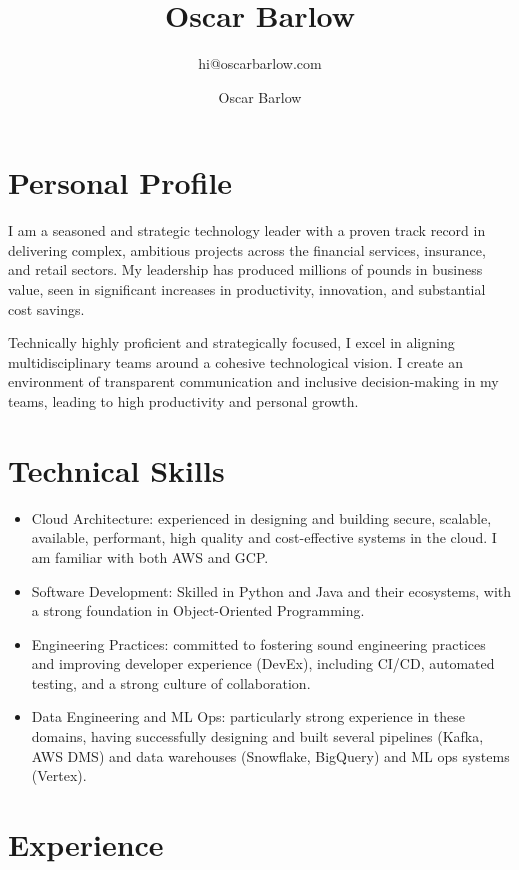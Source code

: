 \documentclass[a4paper]{scrartcl}
\author{Oscar Barlow}
\date{}
\begin{document}
\title{Oscar Barlow}
\subtitle{hi@oscarbarlow.com}
\maketitle

\section*{Personal Profile}
I am a seasoned and strategic technology leader with a proven track record in
delivering complex, ambitious projects across the financial services,
insurance,
and retail sectors. My leadership has produced
millions of pounds in business value, seen in significant increases in
productivity, innovation, and substantial cost savings.

Technically highly proficient and strategically focused, I excel in aligning
multidisciplinary
teams around a cohesive technological vision. I create an environment of
transparent communication and inclusive decision-making in my teams, leading to
high productivity and personal growth.

\section*{Technical Skills}
\begin{itemize}
      \item Cloud Architecture: experienced in designing and building secure,
            scalable, available, performant, high quality and cost-effective
            systems in the
            cloud. I am familiar with both AWS and GCP.
      \item Software Development: Skilled in Python and Java and their
            ecosystems, with a
            strong foundation in Object-Oriented Programming.
      \item Engineering Practices: committed to fostering sound engineering
            practices and improving developer experience (DevEx), including
            CI/CD,
            automated testing, and a strong culture of collaboration.
      \item Data Engineering and ML Ops: particularly strong experience in
            these domains, having successfully designing and built several
            pipelines (Kafka, AWS DMS) and data warehouses (Snowflake,
            BigQuery)
            and ML ops systems (Vertex).
\end{itemize}

\section*{Experience}
\end{document}
